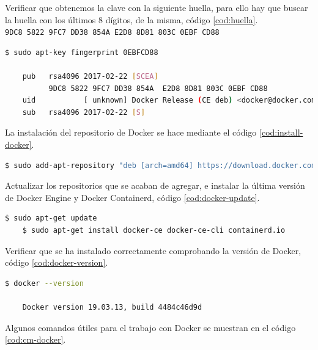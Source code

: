 Verificar que obtenemos la clave con la siguiente huella, para ello hay que buscar la huella con los últimos 8 dígitos, de la misma, código \ref{cod:huella}.\\

\texttt{9DC8 5822 9FC7 DD38 854A  E2D8 8D81 803C 0EBF CD88}\\

\begin{lstlisting}[language=Bash,caption=Instalación Docker. Parte IV, label=cod:huella, style=Consola]
	$ sudo apt-key fingerprint 0EBFCD88

	pub   rsa4096 2017-02-22 [SCEA]
		  9DC8 5822 9FC7 DD38 854A  E2D8 8D81 803C 0EBF CD88
	uid           [ unknown] Docker Release (CE deb) <docker@docker.com>
	sub   rsa4096 2017-02-22 [S]
\end{lstlisting}

La instalación del repositorio de Docker se hace mediante el código \ref{cod:install-docker}.\\ 

\begin{lstlisting}[language=Bash,caption=Instalación Docker. Parte V, label=cod:install-docker, style=Consola]
	$ sudo add-apt-repository "deb [arch=amd64] https://download.docker.com/linux/ubuntu $(lsb_release -cs) stable"
\end{lstlisting}

Actualizar los repositorios que se acaban de agregar, e instalar la última versión de Docker Engine y Docker Containerd, código \ref{cod:docker-update}.\\

\begin{lstlisting}[language=Bash,caption=Instalación Docker. Parte VI, label=cod:docker-update, style=Consola]
	$ sudo apt-get update
	$ sudo apt-get install docker-ce docker-ce-cli containerd.io
\end{lstlisting}

Verificar que se ha instalado correctamente comprobando la versión de Docker, código \ref{cod:docker-version}.\\

\begin{lstlisting}[language=Bash,caption=Instalación Docker. Parte VII, label=cod:docker-version, style=Consola]
	$ docker --version

	Docker version 19.03.13, build 4484c46d9d
\end{lstlisting}

Algunos comandos útiles para el trabajo con Docker se muestran en el código \ref{cod:cm-docker}.\\

